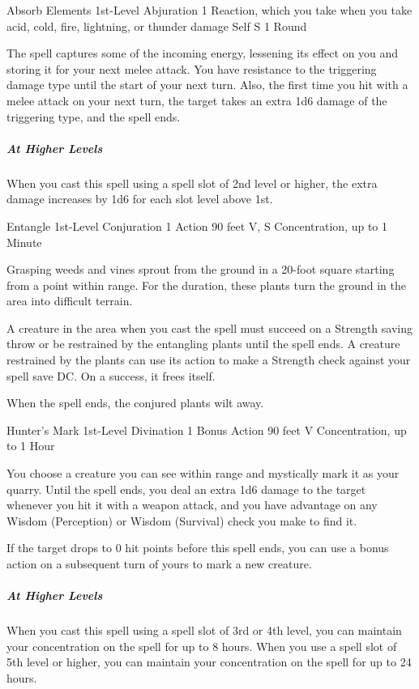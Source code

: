 {\DndSpellHeader
  {Absorb Elements}
  {1st-Level Abjuration}
  {1 Reaction, which you take when you take acid, cold, fire, lightning, or thunder damage}
  {Self}
  {S}
  {1 Round}

The spell captures some of the incoming energy, lessening its effect on you and storing it for your next melee attack. You have resistance to the triggering damage type until the start of your next turn. Also, the first time you hit with a melee attack on your next turn, the target takes an extra 1d6 damage of the triggering type, and the spell ends.

\subparagraph*{At Higher Levels} When you cast this spell using a spell slot of 2nd level or higher, the extra damage increases by 1d6 for each slot level above 1st.

\DndSpellHeader
  {Entangle}
  {1st-Level Conjuration}
  {1 Action}
  {90 feet}
  {V, S}
  {Concentration, up to 1 Minute}

Grasping weeds and vines sprout from the ground in a 20-foot square starting from a point within range. For the duration, these plants turn the ground in the area into difficult terrain.

A creature in the area when you cast the spell must succeed on a Strength saving throw or be restrained by the entangling plants until the spell ends. A creature restrained by the plants can use its action to make a Strength check against your spell save DC. On a success, it frees itself.

When the spell ends, the conjured plants wilt away.

\DndSpellHeader
  {Hunter's Mark}
  {1st-Level Divination}
  {1 Bonus Action}
  {90 feet}
  {V}
  {Concentration, up to 1 Hour}

You choose a creature you can see within range and mystically mark it as your quarry. Until the spell ends, you deal an extra 1d6 damage to the target whenever you hit it with a weapon attack, and you have advantage on any Wisdom (Perception) or Wisdom (Survival) check you make to find it.

If the target drops to 0 hit points before this spell ends, you can use a bonus action on a subsequent turn of yours to mark a new creature.

\subparagraph*{At Higher Levels} When you cast this spell using a spell slot of 3rd or 4th level, you can maintain your concentration on the spell for up to 8 hours. When you use a spell slot of 5th level or higher, you can maintain your concentration on the spell for up to 24 hours.
}